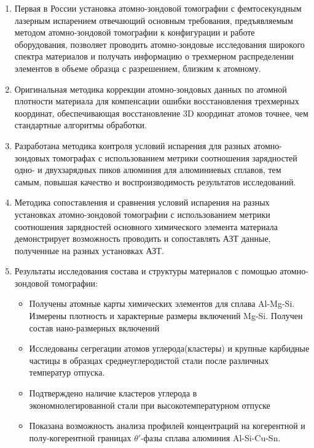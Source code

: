 \clearpage
{}
\begin{enumerate}[beginpenalty=10000] %
  \item Первая в России установка атомно-зондовой томографии с фемтосекундным лазерным испарением отвечающий основным требования, предъявляемым методом атомно-зондовой томографии к конфигурации и работе оборудования, позволяет проводить атомно-зондовые исследования широкого спектра материалов  и получать информацию о трехмерном распределении элементов в объеме образца с разрешением, близким к атомному.
  \item Оригинальная методика коррекции атомно-зондовых данных по атомной плотности материала для компенсации ошибки восстановления трехмерных координат, обеспечивающая восстановление 3D координат атомов точнее, чем стандартные алгоритмы обработки.     
  \item Разработана методика контроля условий испарения для разных атомно-зондовых томографах с использованием метрики соотношения зарядностей одно- и двухзарядных пиков алюминия для алюминиевых сплавов, тем самым, повышая качество и воспроизводимость результатов исследований.
  \item Методика сопоставления и сравнения условий испарения на разных установках атомно-зондовой томографии с использованием метрики соотношения зарядностей основного химического элемента материала демонстрирует возможность проводить и сопоставлять АЗТ данные, полученные на разных установках АЗТ.
  \item Результаты исследования состава и структуры материалов с помощью атомно-зондовой томографии:
  \begin{itemize}
  	\item Получены атомные карты химических элементов для сплава Al-Mg-Si. Измерены плотность и характерные размеры включений Mg-Si. Получен состав нано-размерных включений
  	\item Исследованы сегрегации атомов углерода(кластеры) и крупные карбидные частицы в образцах среднеуглеродистой стали после различных температур отпуска.
  	\item Подтверждено наличие кластеров углерода в \\ экономнолегированной стали при высокотемпературном отпуске
  	\item Показана возможность анализа профилей концентраций на когерентной и полу-когерентной границах $\theta '$-фазы сплава алюминия Al-Si-Cu-Sn.
  \end{itemize}
  
  
\end{enumerate}


